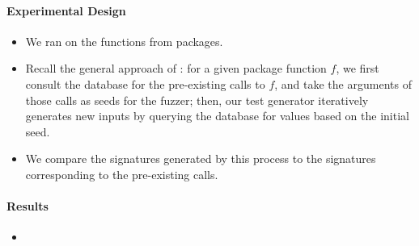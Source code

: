 \paragraph{Experimental Design}
\begin{itemize}
    \item We ran \tool on the   functions from  packages.
    \item Recall the general approach of \tool: for a given package function $f$, we first consult the database for the pre-existing calls to $f$, and take the arguments of those calls as seeds for the fuzzer; then, our test generator iteratively generates new inputs by querying the database for values based on the initial seed.
    \item We compare the signatures generated by this process to the signatures corresponding to the pre-existing calls.
\end{itemize}

\paragraph{Results}

\begin{itemize}
    \item {}
\end{itemize}